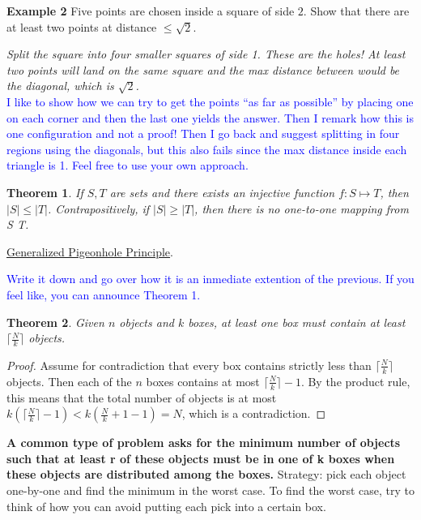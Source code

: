 \documentclass{article}
\newtheorem{theorem}{Theorem}
\begin{document}
{\bf Example 2} Five points are chosen inside a square of side $2$. Show that there are at least two points at distance $\leq \sqrt{2}$.

{\it Split the square into four smaller squares of side 1. These are the holes! At least two points will land on the same square and the max distance between would be the diagonal, which is $\sqrt{2}$.}\\

\textcolor{blue}{I like to show how we can try to get the points ``as far as possible'' by placing one on each corner and then the last one yields the answer. Then I remark how this is one configuration and not a proof! Then I go back and suggest splitting in four regions using the diagonals, but this also fails  since the max distance inside each triangle is 1. Feel free to use your own approach.}

\begin{theorem}
If $S, T$ are sets and there exists an injective function $f: S \mapsto T$, then $|S| \leq |T|$. Contrapositively, if $|S| \geq |T|$, then there is no one-to-one mapping from S \mapsto T.
\end{theorem}


\underline{Generalized Pigeonhole Principle}.

\textcolor{blue}{Write it down and go over how it is an inmediate extention of the previous. If you feel like, you can announce Theorem 1.}

\begin{theorem}
Given $n$ objects and $k$ boxes, at least one box must contain at least $\lceil \frac{N}{k} \rceil$ objects.
\end{theorem}
\begin{proof}
Assume for contradiction that every box contains strictly less than $\lceil \frac{N}{k} \rceil$ objects. Then each of the $n$ boxes contains at most $\lceil \frac{N}{k} \rceil - 1$. By the product rule, this means that the total number of objects is at most $k(\lceil \frac{N}{k} \rceil - 1) < k(\frac{N}{k} + 1 - 1) = N$, which is a contradiction.
\end{proof}

\textbf{A common type of problem asks for the minimum number of objects such that at least r of these objects must be in one of k boxes when these objects are distributed among the boxes.}
Strategy: pick each object one-by-one and find the minimum in the worst case. To find the worst case, try to think of how you can avoid putting each pick into a certain box.
\\
\end{document}

